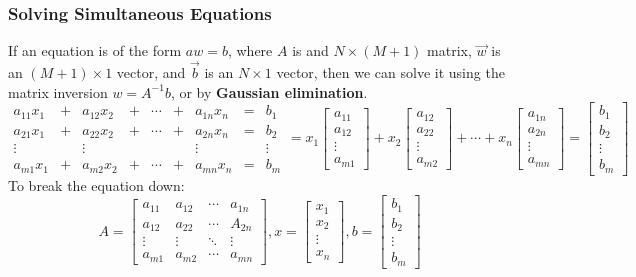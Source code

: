 \documentclass[11pt]{article} %
\begin{document}
\subsubsection{Solving Simultaneous Equations}

If an equation is of the form $aw = b$, where $A$ is and $N \times (M+1)$ matrix, $\vec{w}$ is an $(M+1) \times 1$ vector, and $\vec{b}$ is an $N \times 1$ vector, then we can solve it using the matrix inversion $w = A^{-1}b$, or by {\bf Gaussian elimination}.
\begin{equation}
\begin{array}{ccccccccc}
a_{11}x_1 & + & a_{12}x_2 & + & \cdots & + & a_{1n}x_n & = & b_1 \\
a_{21}x_1 & + & a_{22}x_2 & + & \cdots & + & a_{2n}x_n & = & b_2 \\
\vdots & & \vdots & & & & \vdots & & \vdots \\
a_{m1}x_1 & + & a_{m2}x_2 & + & \cdots & + & a_{mn}x_n & = & b_m
\end{array}
=
x_1
\begin{bmatrix}
a_{11} \\
a_{12} \\
\vdots \\
a_{m1}
\end{bmatrix}
+
x_2
\begin{bmatrix}
a_{12} \\
a_{22} \\
\vdots \\
a_{m2}
\end{bmatrix}
+ \cdots + x_n
\begin{bmatrix}
a_{1n} \\
a_{2n} \\
\vdots \\
a_{mn}
\end{bmatrix}
=
\begin{bmatrix}
b_1 \\
b_2 \\
\vdots \\
b_m
\end{bmatrix}
\end{equation}
To break the equation down:
\begin{equation}
A =
\begin{bmatrix}
a_{11} & a_{12} & \cdots & a_{1n} \\
a_{12} & a_{22} & \cdots & A_{2n} \\
\vdots & \vdots & \ddots & \vdots \\
a_{m1} & a_{m2} & \cdots & a_{mn}
\end{bmatrix}
, x = 
\begin{bmatrix}
x_1 \\
x_2 \\
\vdots \\
x_n
\end{bmatrix}
, b = 
\begin{bmatrix}
b_1 \\
b_2 \\
\vdots \\
b_m
\end{bmatrix}
\end{equation}
\end{document}

